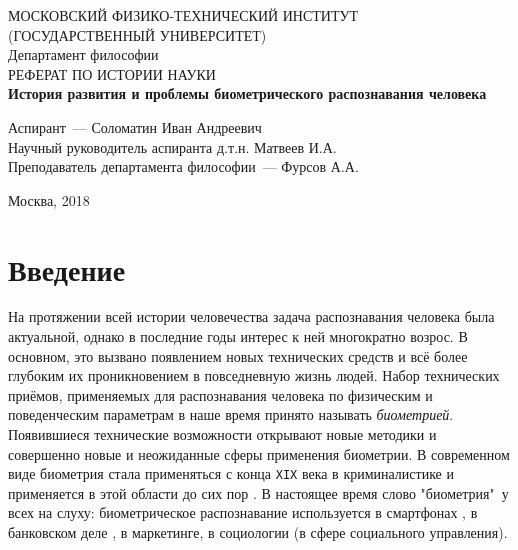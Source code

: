 \documentclass[14pt, a4paper]{extarticle}
\begin{document}
	\begin{titlepage}
		\begin{center}
			\hfill \break
			МОСКОВСКИЙ ФИЗИКО-ТЕХНИЧЕСКИЙ ИНСТИТУТ\\ (ГОСУДАРСТВЕННЫЙ УНИВЕРСИТЕТ)\\
			\hfill \break
			\hfill \break
			\hfill \break
			\hfill \break
			\hfill \break
			Департамент философии\\
			\hfill \break
			\hfill \break
			РЕФЕРАТ ПО ИСТОРИИ НАУКИ\\
			\hfill \break
			\hfill \break
			\large{\textbf{История развития и проблемы биометрического распознавания человека}}\\
			\hfill \break		
		\end{center}
		
		\begin{center}
			\hfill \break
			\parbox{0.9\textwidth}
			{
				Аспирант~--- Соломатин Иван Андреевич \\
				Научный руководитель аспиранта \underline{\hspace{3cm}} д.т.н. Матвеев И.А. \\
				Преподаватель департамента философии~--- Фурсов А.А. \\
			}
		\end{center}
		\hfill \break
		\hfill \break
		\hfill \break
		\hfill \break
		\begin{center} Москва, 2018 
		\end{center}
		\thispagestyle{empty} 
	\end{titlepage}
	
\tableofcontents
\newpage

\section{Введение}
На протяжении всей истории человечества задача распознавания человека была актуальной, однако в последние годы интерес к ней многократно возрос. В основном, это вызвано появлением новых технических средств и всё более глубоким их проникновением в повседневную жизнь людей. Набор технических приёмов, применяемых для распознавания человека по физическим и поведенческим параметрам в наше время принято называть \textit{биометрией}. Появившиеся технические возможности открывают новые методики и совершенно новые и неожиданные сферы применения биометрии. В современном виде биометрия стала применяться с конца \texttt{XIX} века в криминалистике и применяется в этой области до сих пор \cite{tistarelli2014biometrics, bouchrika2011using}. В настоящее время слово "биометрия"\ у всех на слуху: биометрическое распознавание используется в смартфонах \cite{odinokikh2018high, sezan2014user, hwang2009keystroke}, в банковском деле \cite{fatima2011banking, venkatraman2008biometrics}, в маркетинге, в социологии (в сфере социального управления).
\end{document}
